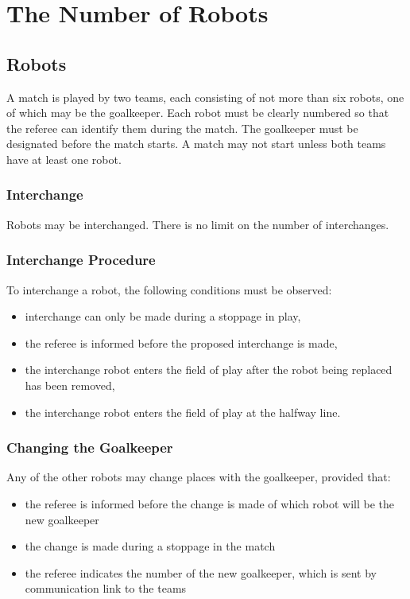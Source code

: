 \section{The Number of Robots}\label{sec:number-of-robots}

\subsection{Robots}
A match is played by two teams, each consisting of not more than six robots, one of which may be the goalkeeper.
Each robot must be clearly numbered so that the referee can identify them during the match.
The goalkeeper must be designated before the match starts.
A match may not start unless both teams have at least one robot.

\subsubsection{Interchange}\label{subsubsec:number-of-robots-interchange}
Robots may be interchanged.
There is no limit on the number of interchanges.

\subsubsection{Interchange Procedure}
To interchange a robot, the following conditions must be observed:
\begin{itemize}
\item interchange can only be made during a stoppage in play,
\item the referee is informed before the proposed interchange is made,
\item the interchange robot enters the field of play after the robot being replaced has been removed,
\item the interchange robot enters the field of play at the halfway line.
\end{itemize}

\subsubsection{Changing the Goalkeeper}
Any of the other robots may change places with the goalkeeper, provided that:
\begin{itemize}
\item the referee is informed before the change is made of which robot will be the new goalkeeper
\item the change is made during a stoppage in the match
\item the referee indicates the number of the new goalkeeper, which is sent by communication link to the teams
\end{itemize}

